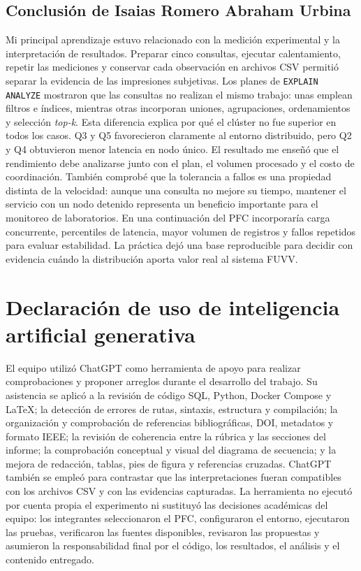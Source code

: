 \documentclass[12pt,a4paper]{article}
\begin{document}
\subsection{Conclusión de Isaias Romero Abraham Urbina}

Mi principal aprendizaje estuvo relacionado con la medición experimental y la interpretación de resultados. Preparar cinco consultas, ejecutar calentamiento, repetir las mediciones y conservar cada observación en archivos CSV permitió separar la evidencia de las impresiones subjetivas. Los planes de \texttt{EXPLAIN ANALYZE} mostraron que las consultas no realizan el mismo trabajo: unas emplean filtros e índices, mientras otras incorporan uniones, agrupaciones, ordenamientos y selección \textit{top-k}. Esta diferencia explica por qué el clúster no fue superior en todos los casos. Q3 y Q5 favorecieron claramente al entorno distribuido, pero Q2 y Q4 obtuvieron menor latencia en nodo único. El resultado me enseñó que el rendimiento debe analizarse junto con el plan, el volumen procesado y el costo de coordinación. También comprobé que la tolerancia a fallos es una propiedad distinta de la velocidad: aunque una consulta no mejore su tiempo, mantener el servicio con un nodo detenido representa un beneficio importante para el monitoreo de laboratorios. En una continuación del PFC incorporaría carga concurrente, percentiles de latencia, mayor volumen de registros y fallos repetidos para evaluar estabilidad. La práctica dejó una base reproducible para decidir con evidencia cuándo la distribución aporta valor real al sistema FUVV.

\section{Declaración de uso de inteligencia artificial generativa}

El equipo utilizó ChatGPT como herramienta de apoyo para realizar comprobaciones y proponer arreglos durante el desarrollo del trabajo. Su asistencia se aplicó a la revisión de código SQL, Python, Docker Compose y LaTeX; la detección de errores de rutas, sintaxis, estructura y compilación; la organización y comprobación de referencias bibliográficas, DOI, metadatos y formato IEEE; la revisión de coherencia entre la rúbrica y las secciones del informe; la comprobación conceptual y visual del diagrama de secuencia; y la mejora de redacción, tablas, pies de figura y referencias cruzadas. ChatGPT también se empleó para contrastar que las interpretaciones fueran compatibles con los archivos CSV y con las evidencias capturadas. La herramienta no ejecutó por cuenta propia el experimento ni sustituyó las decisiones académicas del equipo: los integrantes seleccionaron el PFC, configuraron el entorno, ejecutaron las pruebas, verificaron las fuentes disponibles, revisaron las propuestas y asumieron la responsabilidad final por el código, los resultados, el análisis y el contenido entregado.
\end{document}
